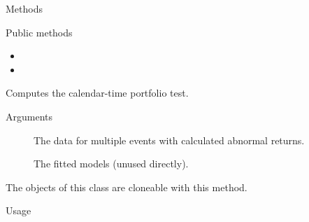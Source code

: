\documentclass[a4paper]{book}
\begin{document}
%
\begin{Section}{Methods}
%
\begin{SubSection}{Public methods}
\begin{itemize}

\item{} 
\item{} 

\end{itemize}

\end{SubSection}




\hypertarget{method-CalendarTimePortfolioTest-compute}{}
%
\begin{SubSection}{}
Computes the calendar-time portfolio test.
%

%
\begin{SubSubSection}{Arguments}

\begin{description}

\item[] The data for multiple events with
calculated abnormal returns.
\item[] The fitted models (unused directly).

\end{description}



\end{SubSubSection}

\end{SubSection}




\hypertarget{method-CalendarTimePortfolioTest-clone}{}
%
\begin{SubSection}{}
The objects of this class are cloneable with this method.
%
\begin{SubSubSection}{Usage}


\end{SubSubSection}
\end{SubSection}
\end{Section}
\end{document}
